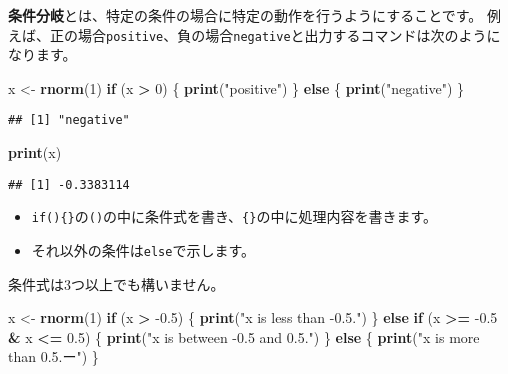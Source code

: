 \documentclass[]{bxjsarticle}
\newenvironment{Shaded}{\begin{snugshade}}{\end{snugshade}}
\newcommand{\ControlFlowTok}[1]{\textcolor[rgb]{0.13,0.29,0.53}{\textbf{#1}}}
\newcommand{\DecValTok}[1]{\textcolor[rgb]{0.00,0.00,0.81}{#1}}
\newcommand{\FloatTok}[1]{\textcolor[rgb]{0.00,0.00,0.81}{#1}}
\newcommand{\KeywordTok}[1]{\textcolor[rgb]{0.13,0.29,0.53}{\textbf{#1}}}
\newcommand{\NormalTok}[1]{#1}
\newcommand{\OperatorTok}[1]{\textcolor[rgb]{0.81,0.36,0.00}{\textbf{#1}}}
\newcommand{\StringTok}[1]{\textcolor[rgb]{0.31,0.60,0.02}{#1}}
\providecommand{\tightlist}{%
  \setlength{\itemsep}{0pt}\setlength{\parskip}{0pt}}
\begin{document}
\textbf{条件分岐}とは、特定の条件の場合に特定の動作を行うようにすることです。
例えば、正の場合\texttt{positive}、負の場合\texttt{negative}と出力するコマンドは次のようになります。

\begin{Shaded}
\begin{Highlighting}[]
\NormalTok{x <-}\StringTok{ }\KeywordTok{rnorm}\NormalTok{(}\DecValTok{1}\NormalTok{)}
\ControlFlowTok{if}\NormalTok{ (x }\OperatorTok{>}\StringTok{ }\DecValTok{0}\NormalTok{) \{}
  \KeywordTok{print}\NormalTok{(}\StringTok{"positive"}\NormalTok{)}
\NormalTok{\} }\ControlFlowTok{else}\NormalTok{ \{}
  \KeywordTok{print}\NormalTok{(}\StringTok{"negative"}\NormalTok{)}
\NormalTok{\}}
\end{Highlighting}
\end{Shaded}

\begin{verbatim}
## [1] "negative"
\end{verbatim}

\begin{Shaded}
\begin{Highlighting}[]
\KeywordTok{print}\NormalTok{(x)}
\end{Highlighting}
\end{Shaded}

\begin{verbatim}
## [1] -0.3383114
\end{verbatim}

\begin{itemize}
\tightlist
\item
  \texttt{if()\{\}}の\texttt{()}の中に条件式を書き、\texttt{\{\}}の中に処理内容を書きます。
\item
  それ以外の条件は\texttt{else}で示します。
\end{itemize}

条件式は3つ以上でも構いません。

\begin{Shaded}
\begin{Highlighting}[]
\NormalTok{x <-}\StringTok{ }\KeywordTok{rnorm}\NormalTok{(}\DecValTok{1}\NormalTok{)}
\ControlFlowTok{if}\NormalTok{ (x }\OperatorTok{>}\StringTok{ }\FloatTok{-0.5}\NormalTok{) \{}
  \KeywordTok{print}\NormalTok{(}\StringTok{"x is less than -0.5."}\NormalTok{)}
\NormalTok{\} }\ControlFlowTok{else} \ControlFlowTok{if}\NormalTok{ (x }\OperatorTok{>=}\StringTok{ }\FloatTok{-0.5} \OperatorTok{&}\StringTok{ }\NormalTok{x }\OperatorTok{<=}\StringTok{ }\FloatTok{0.5}\NormalTok{) \{}
  \KeywordTok{print}\NormalTok{(}\StringTok{"x is between -0.5 and 0.5."}\NormalTok{)}
\NormalTok{\} }\ControlFlowTok{else}\NormalTok{ \{}
  \KeywordTok{print}\NormalTok{(}\StringTok{"x is more than 0.5.ー"}\NormalTok{)}
\NormalTok{\}}
\end{Highlighting}
\end{Shaded}
\end{document}
